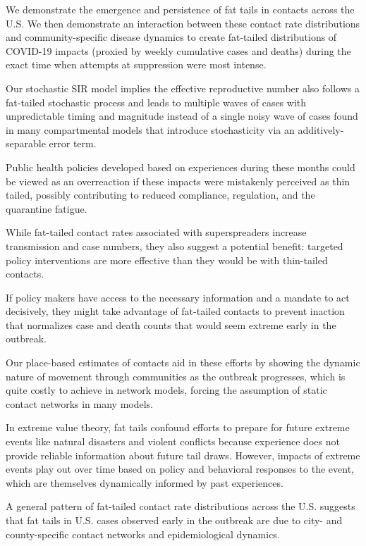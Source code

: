 \documentclass[
]{book}
\begin{document}
We demonstrate the emergence and persistence of fat tails in contacts across the U.S.
We then demonstrate an interaction between these contact rate distributions
and community-specific disease dynamics
to create fat-tailed distributions of COVID-19 impacts
(proxied by weekly cumulative cases and deaths) during the
exact time when attempts at suppression were most intense.

Our stochastic SIR model implies the effective reproductive number
also follows a fat-tailed stochastic process and leads to multiple waves of
cases with unpredictable timing and magnitude instead of a single noisy wave of cases
found in many compartmental models
that introduce stochasticity via an additively-separable error term.

Public health policies developed based on experiences during these months
could be viewed as an overreaction if these impacts were
mistakenly perceived as thin tailed,
possibly contributing to reduced compliance, regulation, and the quarantine fatigue.

While fat-tailed contact rates associated with superspreaders increase transmission
and case numbers, they also suggest a potential benefit: targeted policy
interventions are more effective than they would be with thin-tailed contacts.

If policy makers have access to the necessary information and a mandate to act decisively,
they might take advantage of fat-tailed contacts
to prevent inaction that normalizes case and death counts that
would seem extreme early in the outbreak.

Our place-based estimates of contacts aid in these efforts by showing
the dynamic nature of movement through communities as the outbreak progresses,
which is quite costly to achieve in network models,
forcing the assumption of static contact networks in many models.

In extreme value theory, fat tails confound efforts to prepare for future extreme events
like natural disasters and violent conflicts because
experience does not provide reliable information about future tail draws.
However, impacts of extreme events play out over time based on policy and
behavioral responses to the event,
which are themselves dynamically informed by past experiences.

A general pattern of fat-tailed contact rate distributions across the U.S.
suggests that fat tails in U.S. cases observed early in the outbreak
are due to city- and county-specific contact networks and epidemiological dynamics.
\end{document}
